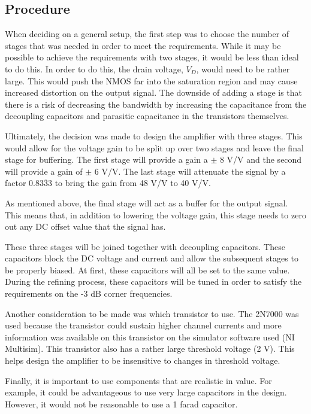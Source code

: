 \documentclass{article}
\begin{document}
    \subsection{Procedure}
  \par
  \quad \quad When deciding on a general setup, the first step was to choose the number of stages that was needed in order to meet the requirements. While it may be possible to achieve the requirements with two stages, it would be less than ideal to do this. In order to do this, the drain voltage, $V_D$, would need to be rather large. This would push the NMOS far into the saturation region and may cause increased distortion on the output signal. The downside of adding a stage is that there is a risk of decreasing the bandwidth by increasing the capacitance from the decoupling capacitors and parasitic capacitance in the transistors themselves. \\
  \par
  \quad Ultimately, the decision was made to design the amplifier with three stages. This would allow for the voltage gain to be split up over two stages and leave the final stage for buffering. The first stage will provide a gain a $\pm$ 8 V/V and the second will provide a gain of $\pm$ 6 V/V. The last stage will attenuate the signal by a factor $0.8\overline{333}$ to bring the gain from 48 V/V to 40 V/V. \\
  \par 
  \quad As mentioned above, the final stage will act as a buffer for the output signal. This means that, in addition to lowering the voltage gain, this stage needs to zero out any DC offset value that the signal has.  \\
  \par 
  \quad These three stages will be joined together with decoupling capacitors. These capacitors block the DC voltage and current and allow the subsequent stages to be properly biased. At first, these capacitors will all be set to the same value. During the refining process, these capacitors will be tuned in order to satisfy the requirements on the -3 dB corner frequencies.  \\
    \par
    \quad Another consideration to be made was which transistor to use. The 2N7000 was used because the transistor could sustain higher channel currents and more information was available on this transistor on the simulator software used (NI Multisim). This transistor also has a rather large threshold voltage (2 V). This helps design the amplifier to be insensitive to changes in threshold voltage. \\
    \par 
    \quad Finally, it is important to use components that are realistic in value. For example, it could be advantageous to use very large capacitors in the design. However, it would not be reasonable to use a 1 farad capacitor. \\
\end{document}
